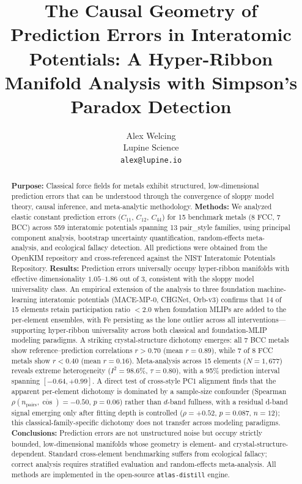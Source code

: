 \documentclass[twocolumn,9pt]{extarticle}
\begin{document}
\title{\bfseries The Causal Geometry of Prediction Errors in Interatomic Potentials: A Hyper-Ribbon Manifold Analysis with Simpson's Paradox Detection}
\author{Alex Welcing\\
\small Lupine Science\\
\small \texttt{alex@lupine.io}}
\date{}

\begin{abstract}
\noindent\textbf{Purpose:} Classical force fields for metals exhibit structured, low-dimensional prediction errors that can be understood through the convergence of sloppy model theory, causal inference, and meta-analytic methodology.
\textbf{Methods:} We analyzed elastic constant prediction errors ($C_{11}$, $C_{12}$, $C_{44}$) for 15 benchmark metals (8 FCC, 7 BCC) across 559 interatomic potentials spanning 13 pair\_style families, using principal component analysis, bootstrap uncertainty quantification, random-effects meta-analysis, and ecological fallacy detection. All predictions were obtained from the OpenKIM repository and cross-referenced against the NIST Interatomic Potentials Repository.
\textbf{Results:} Prediction errors universally occupy hyper-ribbon manifolds with effective dimensionality $1.05$--$1.86$ out of 3, consistent with the sloppy model universality class. An empirical extension of the analysis to three foundation machine-learning interatomic potentials (MACE-MP-0, CHGNet, Orb-v3) confirms that 14 of 15 elements retain participation ratio $<2.0$ when foundation MLIPs are added to the per-element ensembles, with Fe persisting as the lone outlier across all interventions---supporting hyper-ribbon universality across both classical and foundation-MLIP modeling paradigms. A striking crystal-structure dichotomy emerges: all 7 BCC metals show reference--prediction correlations $r>0.70$ (mean $r=0.89$), while 7 of 8 FCC metals show $r<0.40$ (mean $r=0.16$). Meta-analysis across 15 elements ($N=1{,}677$) reveals extreme heterogeneity ($I^2=98.6\%$, $\tau=0.80$), with a 95\% prediction interval spanning $[-0.64, +0.99]$. A direct test of cross-style PC1 alignment finds that the apparent per-element dichotomy is dominated by a sample-size confounder (Spearman $\rho(n_{\text{pairs}}, \overline{\cos}) = -0.50$, $p = 0.06$) rather than $d$-band fullness, with a residual d-band signal emerging only after fitting depth is controlled ($\rho = +0.52$, $p = 0.087$, $n=12$); this classical-family-specific dichotomy does not transfer across modeling paradigms.
\textbf{Conclusions:} Prediction errors are not unstructured noise but occupy strictly bounded, low-dimensional manifolds whose geometry is element- and crystal-structure-dependent. Standard cross-element benchmarking suffers from ecological fallacy; correct analysis requires stratified evaluation and random-effects meta-analysis. All methods are implemented in the open-source \texttt{atlas-distill} engine.
\end{abstract}
\end{document}
